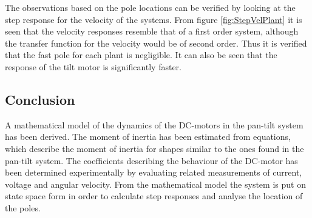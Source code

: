 \documentclass[../../main.tex]{subfiles}
\begin{document}
The observations based on the pole locations can be verified by looking at the step response for the velocity of the systems. From figure \ref{fig:StepVelPlant} it is seen that the velocity responses resemble that of a first order system, although the transfer function for the velocity would be of second order. Thus it is verified that the fast pole for each plant is negligible. It can also be seen that the response of the tilt motor is significantly faster.
 




\subsection{Conclusion}

A mathematical model of the dynamics of the DC-motors in the pan-tilt system has been derived. The moment of inertia has been estimated from equations, which describe the moment of inertia for shapes similar to the ones found in the pan-tilt system. The coefficients describing the behaviour of the DC-motor has been determined experimentally by evaluating related measurements of current, voltage and angular velocity. From the mathematical model the system is put on state space form in order to calculate step responses and analyse the location of the poles.
\end{document}
